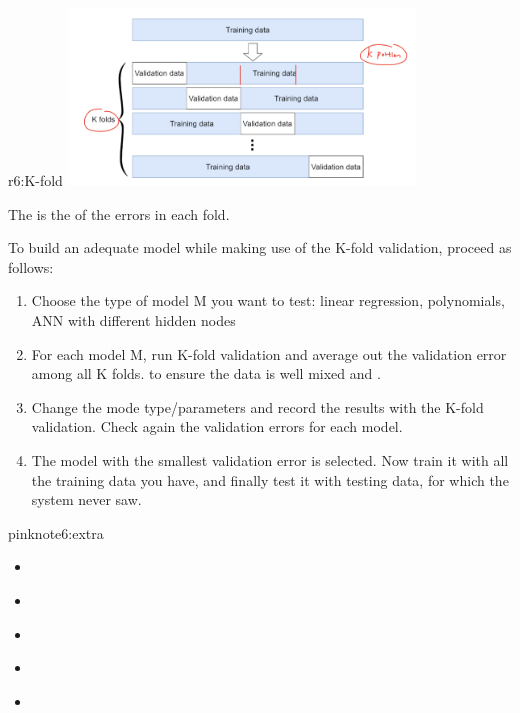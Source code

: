 \documentclass{tron}
\newcommand{\uhref}[2]{\underline{\href{#2}{\color{orange}{#1}}}}
\begin{document}
\begin{remark}{r6:K-fold}
	\includegraphics[width=350px]{Figs/Lec6/k-fold}
	
	The  is the  of the errors in each fold.
	
	To build an adequate model while making use of the K-fold validation, proceed as follows:
	
	\begin{enumerate}
		\item Choose the type of model M you want to test: linear regression, polynomials, \Gls{ANN} with different hidden nodes
		\item For each model M, run K-fold validation and average out the validation error among all K folds.  to ensure the data is well mixed and .
		\item Change the mode type/parameters and record the results with the K-fold validation. Check again the validation errors for each model.
		\item The model with the smallest validation error is selected. Now train it with all the training data you have, and finally test it with testing data, for which the system never saw.
	\end{enumerate}
\end{remark}

\begin{note}{pink}{note6:extra}
	\begin{itemize}
		\item \uhref{Idea [Youtube]}{https://www.youtube.com/watch?v=BqzgUnrNhFM}
		\item \uhref{Theory [Youtube}{https://www.youtube.com/watch?v=nqtfl137jio}
		\item \uhref{Cross-validation [Youtube]}{https://www.youtube.com/watch?v=7062skdX05Y}
		\item \uhref{Overfitting [Tut Paper]}{https://arxiv.org/pdf/1905.12787.pdf}
		\item \uhref{Early Stopping [Reading]}{https://machinelearningmastery.com/early-stopping-to-avoid-overtraining-neural-network-mo}
	\end{itemize}
\end{note}
\end{document}
